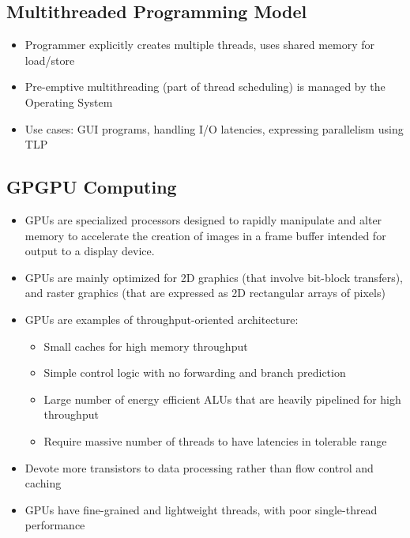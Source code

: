 \documentclass{article}
\begin{document}
\subsection{Multithreaded Programming Model}
\begin{itemize}
    \item Programmer explicitly creates multiple threads, uses shared memory for load/store
    
    \item Pre-emptive multithreading (part of thread scheduling) is managed by the Operating System
    
    \item Use cases: GUI programs, handling I/O latencies, expressing parallelism using TLP 
\end{itemize}

\subsection{GPGPU Computing}
\begin{itemize}
    \item GPUs are specialized processors designed to rapidly manipulate and alter memory to accelerate the creation of images in a frame buffer intended for output to a display device.
    
    \item GPUs are mainly optimized for 2D graphics (that involve bit-block transfers), and raster graphics (that are expressed as 2D rectangular arrays of pixels)
    
    \item GPUs are examples of throughput-oriented architecture:
    \begin{itemize}
        \item Small caches for high memory throughput
        
        \item Simple control logic with no forwarding and branch prediction
        
        \item Large number of energy efficient ALUs that are heavily pipelined for high throughput
        
        \item Require massive number of threads to have latencies in tolerable range
    \end{itemize}
    
    \item Devote more transistors to data processing rather than flow control and caching
    
    \item GPUs have fine-grained and lightweight threads, with poor single-thread performance
\end{itemize}
\end{document}

